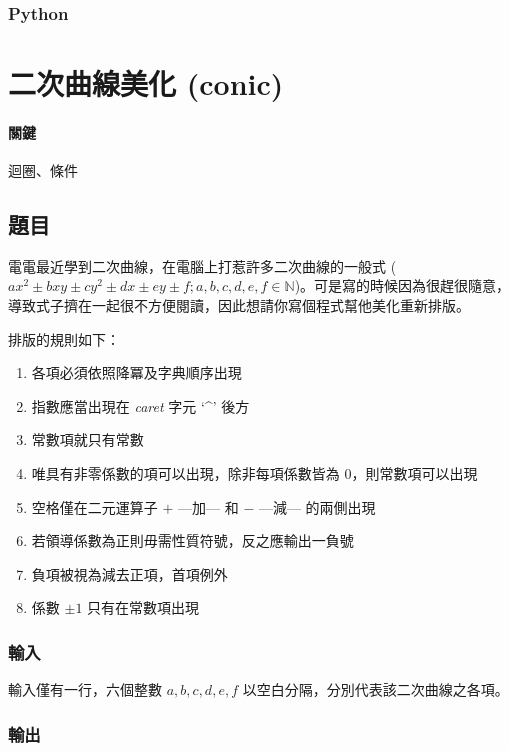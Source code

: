 \documentclass[a4paper,10pt]{article}
\begin{document}


\subsubsection{Python}



\section{二次曲線美化 (conic)}

\paragraph{關鍵} 迴圈、條件

\subsection{題目}

電電最近學到二次曲線，在電腦上打惹許多二次曲線的一般式 ($ax^2 \pm bxy \pm cy^2 \pm dx \pm ey \pm f; a, b, c, d, e, f \in \mathbb{N}$)。可是寫的時候因為很趕很隨意，導致式子擠在一起很不方便閱讀，因此想請你寫個程式幫他美化重新排版。

排版的規則如下：
\begin{enumerate}
 \item 各項必須依照降冪及字典順序出現
 \item 指數應當出現在 \textit{caret} 字元 `\enspace\textbf{\^}' 後方
 \item 常數項就只有常數
 \item 唯具有非零係數的項可以出現，除非每項係數皆為 $0$，則常數項可以出現
 \item 空格僅在二元運算子 $\mathbf{+}$ ---加--- 和 $\mathbf{-}$ ---減--- 的兩側出現
 \item 若領導係數為正則毋需性質符號，反之應輸出一負號
 \item 負項被視為減去正項，首項例外
 \item 係數 $\pm1$ 只有在常數項出現
\end{enumerate}

\subsubsection{輸入}

輸入僅有一行，六個整數 $a, b, c, d, e, f$ 以空白分隔，分別代表該二次曲線之各項。

\subsubsection{輸出}
\end{document}
